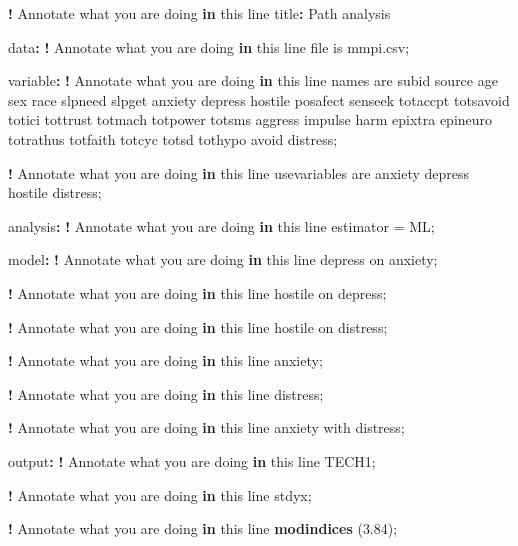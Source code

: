 \documentclass[
]{book}
\newenvironment{Shaded}{\begin{snugshade}}{\end{snugshade}}
\newcommand{\ControlFlowTok}[1]{\textcolor[rgb]{0.13,0.29,0.53}{\textbf{#1}}}
\newcommand{\FloatTok}[1]{\textcolor[rgb]{0.00,0.00,0.81}{#1}}
\newcommand{\FunctionTok}[1]{\textcolor[rgb]{0.13,0.29,0.53}{\textbf{#1}}}
\newcommand{\NormalTok}[1]{#1}
\newcommand{\OtherTok}[1]{\textcolor[rgb]{0.56,0.35,0.01}{#1}}
\newcommand{\SpecialCharTok}[1]{\textcolor[rgb]{0.81,0.36,0.00}{\textbf{#1}}}
\begin{document}
\begin{Shaded}
\begin{Highlighting}[]
\SpecialCharTok{!}\NormalTok{ Annotate what you are doing }\ControlFlowTok{in}\NormalTok{ this line}
\NormalTok{title}\SpecialCharTok{:}\NormalTok{ Path analysis}

\NormalTok{data}\SpecialCharTok{:}
\SpecialCharTok{!}\NormalTok{ Annotate what you are doing }\ControlFlowTok{in}\NormalTok{ this line}
\NormalTok{file is mmpi.csv;}

\NormalTok{variable}\SpecialCharTok{:}
\SpecialCharTok{!}\NormalTok{ Annotate what you are doing }\ControlFlowTok{in}\NormalTok{ this line}
\NormalTok{names are subid source age sex race slpneed slpget anxiety depress}
\NormalTok{hostile posafect senseek totaccpt totsavoid totici tottrust totmach}
\NormalTok{totpower totsms aggress impulse harm epixtra epineuro totrathus}
\NormalTok{totfaith totcyc totsd tothypo avoid distress;}

\SpecialCharTok{!}\NormalTok{ Annotate what you are doing }\ControlFlowTok{in}\NormalTok{ this line}
\NormalTok{usevariables are anxiety depress hostile distress;}

\NormalTok{analysis}\SpecialCharTok{:}
\SpecialCharTok{!}\NormalTok{ Annotate what you are doing }\ControlFlowTok{in}\NormalTok{ this line}
\NormalTok{estimator }\OtherTok{=}\NormalTok{ ML;}

\NormalTok{model}\SpecialCharTok{:}
\SpecialCharTok{!}\NormalTok{ Annotate what you are doing }\ControlFlowTok{in}\NormalTok{ this line}
\NormalTok{depress on anxiety;}

\SpecialCharTok{!}\NormalTok{ Annotate what you are doing }\ControlFlowTok{in}\NormalTok{ this line}
\NormalTok{hostile on depress;}

\SpecialCharTok{!}\NormalTok{ Annotate what you are doing }\ControlFlowTok{in}\NormalTok{ this line}
\NormalTok{hostile on distress;}

\SpecialCharTok{!}\NormalTok{ Annotate what you are doing }\ControlFlowTok{in}\NormalTok{ this line}
\NormalTok{anxiety;}

\SpecialCharTok{!}\NormalTok{ Annotate what you are doing }\ControlFlowTok{in}\NormalTok{ this line}
\NormalTok{distress;}

\SpecialCharTok{!}\NormalTok{ Annotate what you are doing }\ControlFlowTok{in}\NormalTok{ this line}
\NormalTok{anxiety with distress;}

\NormalTok{output}\SpecialCharTok{:}
\SpecialCharTok{!}\NormalTok{ Annotate what you are doing }\ControlFlowTok{in}\NormalTok{ this line}
\NormalTok{TECH1;}

\SpecialCharTok{!}\NormalTok{ Annotate what you are doing }\ControlFlowTok{in}\NormalTok{ this line}
\NormalTok{stdyx;}

\SpecialCharTok{!}\NormalTok{ Annotate what you are doing }\ControlFlowTok{in}\NormalTok{ this line}
\FunctionTok{modindices}\NormalTok{ (}\FloatTok{3.84}\NormalTok{);}
\end{Highlighting}
\end{Shaded}
\end{document}
